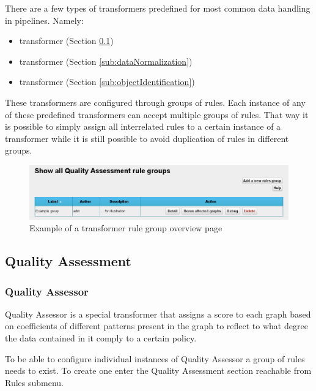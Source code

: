 	There are a few types of {transformers} predefined for most common data handling in pipelines. Namely:
	\begin{itemize}
		\item {} {transformer} (Section \ref{sub:qualityAssessment})
		\item {} {transformer}  (Section \ref{sub:dataNormalization})
		\item {} {transformer} (Section \ref{sub:objectIdentification})
	\end{itemize}
	
	These {transformers} are configured through groups of rules. Each instance of any of these predefined {transformers} can accept multiple groups of rules. That way it is possible to simply assign all interrelated rules to a certain instance of a transformer while it is still possible to avoid duplication of rules in different groups.

\begin{figure}[!ht]
    \centering
    \includegraphics[width=\textwidth]{images/fe-rule-groups.png}
    \caption{Example of a transformer rule group overview page}
	\label{fig:feRuleGroups}
\end{figure}

\subsection{Quality Assessment}
\label{sub:qualityAssessment}

\subsubsection*{Quality Assessor}

Quality Assessor is a special {transformer} that assigns a score to each graph based on coefficients of different patterns present in the graph to reflect to what degree the data contained in it comply to a certain policy.

To be able to configure individual instances of {Quality Assessor} a group of rules needs to exist. To create one enter the Quality Assessment section reachable from Rules submenu.

